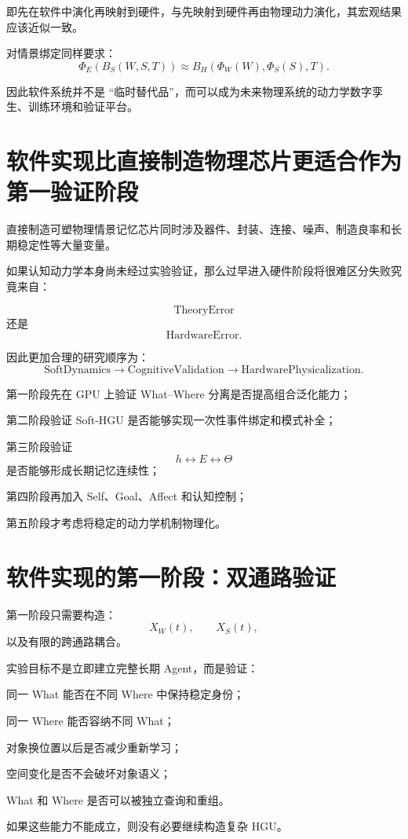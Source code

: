 即先在软件中演化再映射到硬件，与先映射到硬件再由物理动力演化，其宏观结果应该近似一致。

对情景绑定同样要求：
\[
\Phi_E
\left(
B_S(W,S,T)
\right)
\approx
B_H
\left(
\Phi_W(W),
\Phi_S(S),
T
\right).
\]

因此软件系统并不是 ``临时替代品''，而可以成为未来物理系统的动力学数字孪生、训练环境和验证平台。

\section{软件实现比直接制造物理芯片更适合作为第一验证阶段}

直接制造可塑物理情景记忆芯片同时涉及器件、封装、连接、噪声、制造良率和长期稳定性等大量变量。

如果认知动力学本身尚未经过实验验证，那么过早进入硬件阶段将很难区分失败究竟来自：

\[
\mathrm{TheoryError}
\]
还是
\[
\mathrm{HardwareError}.
\]

因此更加合理的研究顺序为：
\[
\boxed{
\mathrm{SoftDynamics}
\rightarrow
\mathrm{CognitiveValidation}
\rightarrow
\mathrm{HardwarePhysicalization}.
}
\]

第一阶段先在 GPU 上验证 What--Where 分离是否提高组合泛化能力；

第二阶段验证 Soft-HGU 是否能够实现一次性事件绑定和模式补全；

第三阶段验证
\[
h\leftrightarrow E\leftrightarrow\Theta
\]
是否能够形成长期记忆连续性；

第四阶段再加入 Self、Goal、Affect 和认知控制；

第五阶段才考虑将稳定的动力学机制物理化。

\section{软件实现的第一阶段：双通路验证}

第一阶段只需要构造：
\[
X_W(t),
\qquad
X_S(t),
\]
以及有限的跨通路耦合。

实验目标不是立即建立完整长期 Agent，而是验证：

同一 What 能否在不同 Where 中保持稳定身份；

同一 Where 能否容纳不同 What；

对象换位置以后是否减少重新学习；

空间变化是否不会破坏对象语义；

What 和 Where 是否可以被独立查询和重组。

如果这些能力不能成立，则没有必要继续构造复杂 HGU。

